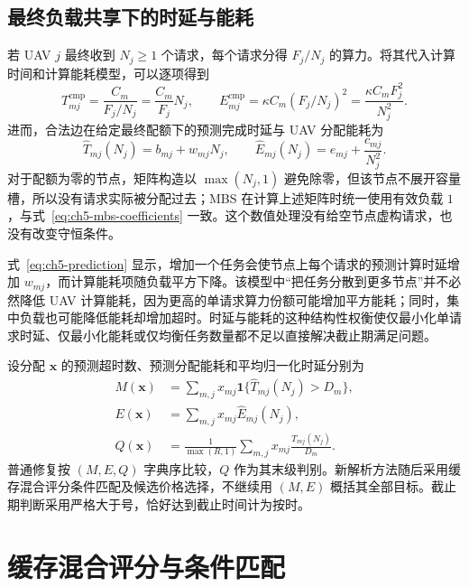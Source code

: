 \subsection{最终负载共享下的时延与能耗}

若 UAV $j$ 最终收到 $N_j\ge1$ 个请求，每个请求分得 $F_j/N_j$ 的算力。将其代入计算时间和计算能耗模型，可以逐项得到
\begin{equation}
 T_{mj}^{\mathrm{cmp}}=\frac{C_m}{F_j/N_j}=\frac{C_m}{F_j}N_j,
 \qquad
 E_{mj}^{\mathrm{cmp}}=\kappa C_m(F_j/N_j)^2
 =\frac{\kappa C_mF_j^2}{N_j^2}.
 \label{eq:ch5-sharing-derivation}
\end{equation}
进而，合法边在给定最终配额下的预测完成时延与 UAV 分配能耗为
\begin{equation}
 \widehat T_{mj}(N_j)=b_{mj}+w_{mj}N_j,\qquad
 \widehat E_{mj}(N_j)=e_{mj}+\frac{c_{mj}}{N_j^2}.
 \label{eq:ch5-prediction}
\end{equation}
对于配额为零的节点，矩阵构造以 $\max(N_j,1)$ 避免除零，但该节点不展开容量槽，所以没有请求实际被分配过去；MBS 在计算上述矩阵时统一使用有效负载 $1$，与式~\eqref{eq:ch5-mbs-coefficients} 一致。这个数值处理没有给空节点虚构请求，也没有改变守恒条件。

式~\eqref{eq:ch5-prediction} 显示，增加一个任务会使节点上每个请求的预测计算时延增加 $w_{mj}$，而计算能耗项随负载平方下降。该模型中“把任务分散到更多节点”并不必然降低 UAV 计算能耗，因为更高的单请求算力份额可能增加平方能耗；同时，集中负载也可能降低能耗却增加超时。时延与能耗的这种结构性权衡使仅最小化单请求时延、仅最小化能耗或仅均衡任务数量都不足以直接解决截止期满足问题。

设分配 $\mathbf{x}$ 的预测超时数、预测分配能耗和平均归一化时延分别为
\begin{equation}
 \begin{aligned}
 M(\mathbf{x})&=\sum_{m,j}x_{mj}\mathbf{1}\{\widehat T_{mj}(N_j)>D_m\},\\
 E(\mathbf{x})&=\sum_{m,j}x_{mj}\widehat E_{mj}(N_j),\\
 Q(\mathbf{x})&=\frac{1}{\max(R,1)}\sum_{m,j}x_{mj}\frac{\widehat T_{mj}(N_j)}{D_m}.
 \end{aligned}
 \label{eq:ch5-predictor-objective}
\end{equation}
普通修复按 $(M,E,Q)$ 字典序比较，$Q$ 作为其末级判别。新解析方法随后采用缓存混合评分条件匹配及候选价格选择，不继续用 $(M,E)$ 概括其全部目标。截止期判断采用严格大于号，恰好达到截止时间计为按时。


\section{缓存混合评分与条件匹配}
\label{sec:ch5-matching}
